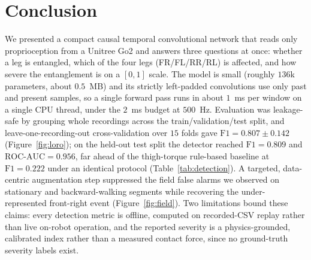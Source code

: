 \documentclass[conference]{IEEEtran}
\begin{document}
\section{Conclusion}
We presented a compact causal temporal convolutional network that reads only proprioception from a Unitree Go2 and answers three questions at once: whether a leg is entangled, which of the four legs (FR/FL/RR/RL) is affected, and how severe the entanglement is on a $[0,1]$ scale. The model is small (roughly $136$k parameters, about $0.5$~MB) and its strictly left-padded convolutions use only past and present samples, so a single forward pass runs in about $1$~ms per window on a single CPU thread, under the $2$~ms budget at $500$~Hz. Evaluation was leakage-safe by grouping whole recordings across the train/validation/test split, and leave-one-recording-out cross-validation over $15$ folds gave $\mathrm{F1}=0.807\pm0.142$ (Figure~\ref{fig:loro}); on the held-out test split the detector reached $\mathrm{F1}=0.809$ and $\mathrm{ROC\text{-}AUC}=0.956$, far ahead of the thigh-torque rule-based baseline at $\mathrm{F1}=0.222$ under an identical protocol (Table~\ref{tab:detection}). A targeted, data-centric augmentation step suppressed the field false alarms we observed on stationary and backward-walking segments while recovering the under-represented front-right event (Figure~\ref{fig:field}). Two limitations bound these claims: every detection metric is offline, computed on recorded-CSV replay rather than live on-robot operation, and the reported severity is a physics-grounded, calibrated index rather than a measured contact force, since no ground-truth severity labels exist.

\clearpage


\end{document}
